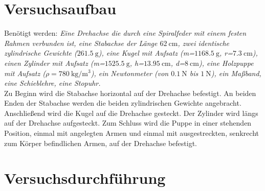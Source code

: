 {\section{Versuchsaufbau}\justifying

Benötigt werden: \textit{Eine Drehachse die durch eine Spiralfeder mit einem festen Rahmen verbunden ist, eine Stabachse der Länge $\SI{62}{\centi\meter}$, 
zwei identische zylindrische Gewichte ($\SI{261.5}{\gram}$), eine Kugel mit Aufsatz (m=$\SI{1168.5}{\gram}$, r=$\SI{7.3}{\centi\meter}$), einen Zylinder mit 
Aufsatz (m=$\SI{1525.5}{\gram}$, h=$\SI{13,95}{\centi\meter}$, d=$\SI{8}{\centi\meter}$), eine Holzpuppe mit Aufsatz ($\rho=\SI{780}{\kilo\gram\per\cubic\meter}$), 
ein Newtonmeter (von $\SI{0.1}{\newton}$ bis $\SI{1}{\newton}$), ein Ma\ss band, eine Schieblehre, eine Stopuhr.}\\
Zu Beginn wird die Stabachse horizontal auf der Drehachse befestigt. An beiden Enden der Stabachse werden die beiden zylindrischen Gewichte angebracht.
Anschließend wird die Kugel auf die Drehachse gesteckt.
Der Zylinder wird längs auf der Drehachse aufgesteckt. 
Zum Schluss wird die Puppe in einer stehenden Position, einmal mit angelegten Armen und einmal mit ausgestreckten, senkrecht zum Körper befindlichen
Armen, auf der Drehachse befestigt.

\section{Versuchsdurchführung}\justifying

}
